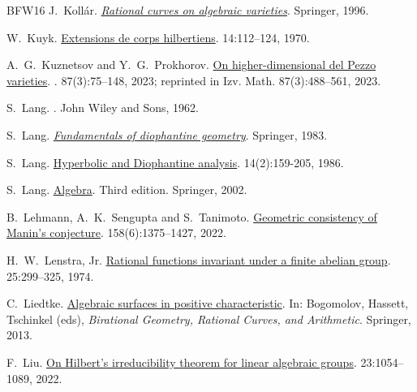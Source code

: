 \documentclass[10pt,a4paper]{amsart}
\theoremstyle{plain}
\theoremstyle{remark}
\numberwithin{theorem}{section}
\begin{document}
\begin{thebibliography}{BFW16}
J.~Koll\'ar.
\newblock \href{https://doi.org/10.1007/978-3-662-03276-3}{\em Rational curves on algebraic varieties}.
\newblock Springer, 1996.

W.~Kuyk.
\newblock \href{https://doi.org/10.1016/0021-8693(70)90138-9}{Extensions de corps hilbertiens}.
 14:112--124, 1970.

A.~G.~Kuznetsov and Y.~G.~Prokhorov.
\newblock \href{https://doi.org/10.4213/im9385}{On higher-dimensional del Pezzo varieties}. 
. 87(3):75--148, 2023; reprinted in
Izv. Math. 87(3):488--561, 2023.

S.~Lang.
.
\newblock John Wiley and Sons, 1962.

S.~Lang.
\newblock \href{https://doi.org/10.1007/978-1-4757-1810-2}{\em Fundamentals of diophantine geometry}.
\newblock Springer, 1983.

S.~Lang.
\newblock \href{https://projecteuclid.org/journals/bulletin-of-the-american-mathematical-society-new-series/volume-14/issue-2/Hyperbolic-and-Diophantine-analysis/bams/1183553166.full?tab=ArticleLink}{Hyperbolic and Diophantine analysis}.
 14(2):159-205, 1986.

S.~Lang.
\newblock \href{https://doi.org/10.1007/978-1-4613-0041-0}{Algebra}.
\newblock Third edition. Springer, 2002.

B.~Lehmann, A.~K.~Sengupta and S.~Tanimoto. 
\newblock \href{https://doi.org/10.1112/S0010437X22007588}{Geometric consistency of Manin’s conjecture}. 
 158(6):1375--1427, 2022. 

H.~W.~Lenstra, Jr.
\newblock \href{https://doi.org/10.1007/BF01389732}{Rational functions invariant under a finite abelian group}.
 25:299--325, 1974.

C.~Liedtke.
\newblock \href{https://doi.org/10.1007/978-1-4614-6482-2_11}{Algebraic surfaces in positive characteristic}.
\newblock In: Bogomolov, Hassett, Tschinkel (eds), {\em Birational Geometry, Rational Curves, and Arithmetic}. Springer, 2013. 

F.~Liu.
\newblock \href{https://doi.org/10.2422/2036-2145.202005_013}{On Hilbert's irreducibility theorem for linear algebraic groups}.
 23:1054--1089, 2022.


\end{thebibliography}
\end{document}
